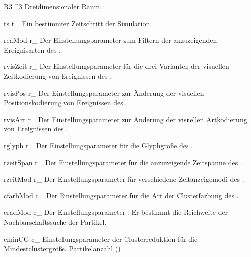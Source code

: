 %

\glossarysymbol%
	{R3}%
	{^3}%
	{Dreidimensionaler Raum.}
	{\emptyset}

\glossarysymbol%
	{ts}%
	{t_}%
	{Ein bestimmter Zeitschritt der Simulation.}%
	{\emptyset}

\glossarysymbol%
	{reaMod}%
	{r_}%
	{Der Einstellungsparameter zum Filtern der anzuzeigenden Ereignisarten des .}%
	{\emptyset}

\glossarysymbol%
	{rvisZeit}%
	{r_}%
	{Der Einstellungsparameter für die drei Varianten der visuellen Zeitkodierung von Ereignissen des .}%
	{\emptyset}

\glossarysymbol%
	{rvisPos}%
	{r_}%
	{Der Einstellungsparameter zur Änderung der visuellen Positionskodierung von Ereignissen des .}%
	{\emptyset}

\glossarysymbol%
	{rvisArt}%
	{r_}%
	{Der Einstellungsparameter zur Änderung der visuellen Artkodierung von Ereignissen des .}%
	{\emptyset}

\glossarysymbol%
	{rglyph}%
	{r_}%
	{Der Einstellungsparameter für die Glyphgröße des .}%
	{\emptyset}

\glossarysymbol%
	{rzeitSpan}%
	{r_}%
	{Der Einstellungsparameter für die anzuzeigende Zeitspanne des .}%
	{\emptyset}

\glossarysymbol%
	{rzeitMod}%
	{r_}%
	{Der Einstellungsparameter für verschiedene Zeitanzeigemodi des .}%
	{\emptyset}

\glossarysymbol%
	{cfarbMod}%
	{c_}%
	{Der Einstellungsparameter für die Art der Clusterfärbung des \SECalc.}%
	{\emptyset}

\glossarysymbol%
	{cradMod}%
	{c_}%
	{Der Einstellungsparameter . Er bestimmt die Reichweite der Nachbarschaftssuche der Partikel.}%
	{\emptyset}

\glossarysymbol%
	{cminCG}%
	{c_}%
	{Einstellungsparameter der Clusterreduktion für die Mindestclustergröße.}%
	{Partikelanzahl (\emptyset)}

